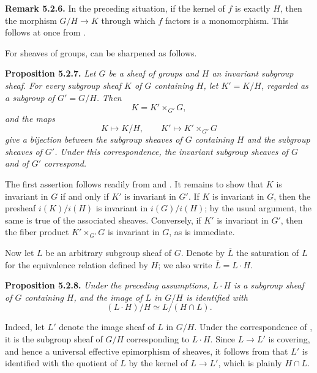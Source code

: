 \medskip
\noindent{}\textbf{Remark 5.2.6.}
In the preceding situation, if the kernel of \(f\) is exactly \(H\), then
the morphism \(G/H\to K\) through which \(f\) factors is a monomorphism.
This follows at once from .

For sheaves of groups,  can be sharpened as follows.

\medskip
\noindent{}\textbf{Proposition 5.2.7.}
\textit{Let \(G\) be a sheaf of groups and \(H\) an invariant subgroup
sheaf. For every subgroup sheaf \(K\) of \(G\) containing \(H\), let
\(K'=K/H\), regarded as a subgroup of \(G'=G/H\). Then}
\[
  K=K'\times_{G'}G,
\]
\textit{and the maps}
\[
  K\longmapsto K/H,
  \qquad
  K'\longmapsto K'\times_{G'}G
\]
\textit{give a bijection between the subgroup sheaves of \(G\) containing
\(H\) and the subgroup sheaves of \(G'\). Under this correspondence, the
invariant subgroup sheaves of \(G\) and of \(G'\) correspond.}

The first assertion follows readily from  and . It remains to
show that \(K\) is invariant in \(G\) if and only if \(K'\) is invariant in
\(G'\). If \(K\) is invariant in \(G\), then the presheaf
\(i(K)/i(H)\) is invariant in \(i(G)/i(H)\); by the usual argument, the
same is true of the associated sheaves. Conversely, if \(K'\) is invariant
in \(G'\), then the fiber product \(K'\times_{G'}G\) is invariant in
\(G\), as is immediate.

Now let \(L\) be an arbitrary subgroup sheaf of \(G\). Denote by
\(\overline L\) the saturation of \(L\) for the equivalence relation
defined by \(H\); we also write \(\overline L=L\cdot H\).

\medskip
\noindent{}\textbf{Proposition 5.2.8.}
\textit{Under the preceding assumptions, \(L\cdot H\) is a subgroup sheaf
of \(G\) containing \(H\), and the image of \(L\) in \(G/H\) is
identified with}
\[
  (L\cdot H)/H\simeq L/(H\cap L).
\]

Indeed, let \(L'\) denote the image sheaf of \(L\) in \(G/H\). Under the
correspondence of , it is the subgroup sheaf of
\(G/H\) corresponding to \(L\cdot H\). Since \(L\to L'\) is covering,
and hence a universal effective epimorphism of sheaves, it follows from
 that \(L'\) is identified with the quotient of \(L\) by the kernel
of \(L\to L'\), which is plainly \(H\cap L\).

